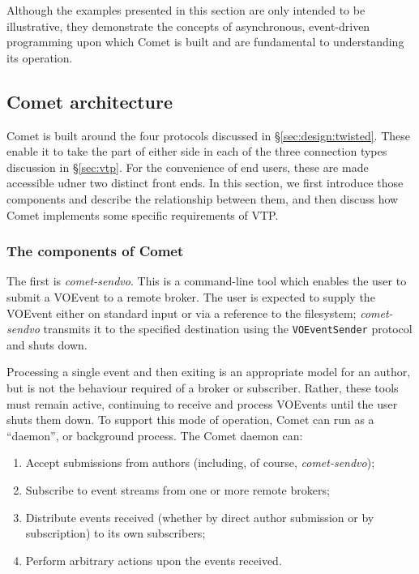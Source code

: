 \documentclass[5p,authoryear]{elsarticle}
\begin{document}
Although the examples presented in this section are only intended to be
illustrative, they demonstrate the concepts of asynchronous, event-driven
programming upon which Comet is built and are fundamental to understanding its
operation.

\subsection{Comet architecture}
\label{sec:design:architecture}

Comet is built around the four protocols discussed in
\S\ref{sec:design:twisted}. These enable it to take the part of either side in
each of the three connection types discussion in \S\ref{sec:vtp}. For the
convenience of end users, these are made accessible udner two distinct front
ends. In this section, we first introduce those components and describe the
relationship between them, and then discuss how Comet implements some specific
requirements of VTP.

\subsubsection{The components of Comet}
\label{sec:design:components}

The first is \textit{comet-sendvo}. This is a command-line tool which enables
the user to submit a VOEvent to a remote broker. The user is expected to
supply the VOEvent either on standard input or via a reference to the
filesystem; \textit{comet-sendvo} transmits it to the specified destination
using the \texttt{VOEventSender} protocol and shuts down.

Processing a single event and then exiting is an appropriate model for an
author, but is not the behaviour required of a broker or subscriber. Rather,
these tools must remain active, continuing to receive and process VOEvents
until the user shuts them down. To support this mode of operation, Comet can
run as a ``daemon'', or background process. The Comet daemon can:

\begin{enumerate}

  \item{Accept submissions from authors (including, of course, \textit{comet-sendvo});}

  \item{Subscribe to event streams from one or more remote brokers;}

  \item{Distribute events received (whether by direct author submission or by subscription) to its own subscribers;}

  \item{Perform arbitrary actions upon the events received.}

\end{enumerate}
\end{document}
